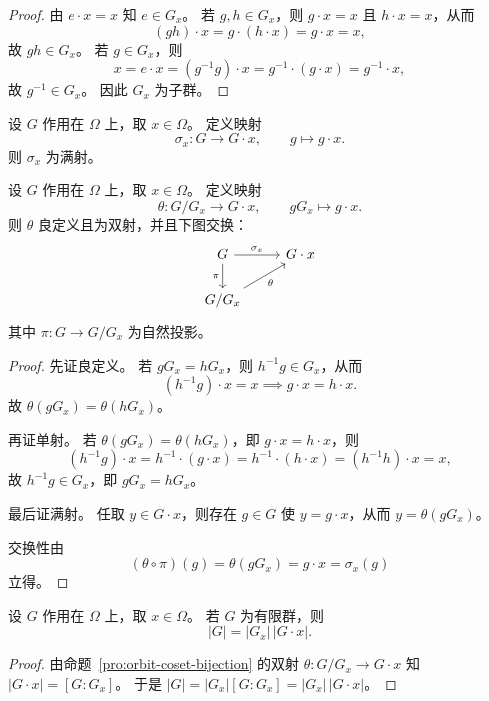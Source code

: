 \documentclass[lang=cn,a4paper,newtx]{elegantbook}
\begin{document}
\begin{proof}
  由 $e\cdot x=x$ 知 $e\in G_x$。
  若 $g,h\in G_x$，则 $g\cdot x=x$ 且 $h\cdot x=x$，从而
  \[
    (gh)\cdot x=g\cdot(h\cdot x)=g\cdot x=x,
  \]
  故 $gh\in G_x$。
  若 $g\in G_x$，则
  \[
    x=e\cdot x=(g^{-1}g)\cdot x=g^{-1}\cdot(g\cdot x)=g^{-1}\cdot x,
  \]
  故 $g^{-1}\in G_x$。
  因此 $G_x$ 为子群。
\end{proof}

\begin{definition}[轨道映射]
  设 $G$ 作用在 $\Omega$ 上，取 $x\in\Omega$。
  定义映射
  \[
    \sigma_x:G\to G\cdot x,\qquad g\mapsto g\cdot x.
  \]
  则 $\sigma_x$ 为满射。
\end{definition}

\begin{proposition}[轨道与陪集的对应]\label{orbit-coset-bijection}
  设 $G$ 作用在 $\Omega$ 上，取 $x\in\Omega$。
  定义映射
  \[
    \theta:G/G_x\to G\cdot x,\qquad gG_x\mapsto g\cdot x.
  \]
  则 $\theta$ 良定义且为双射，并且下图交换：
  \[
    \begin{tikzcd}
      G \arrow[r,"\sigma_x"] \arrow[d,"\pi"'] & G\cdot x \\
      G/G_x \arrow[ru,"\theta"'] &
    \end{tikzcd}
  \]
  其中 $\pi:G\to G/G_x$ 为自然投影。
\end{proposition}

\begin{proof}
  先证良定义。
  若 $gG_x=hG_x$，则 $h^{-1}g\in G_x$，从而
  \[
    (h^{-1}g)\cdot x=x\implies g\cdot x=h\cdot x.
  \]
  故 $\theta(gG_x)=\theta(hG_x)$。

  再证单射。
  若 $\theta(gG_x)=\theta(hG_x)$，即 $g\cdot x=h\cdot x$，则
  \[
    (h^{-1}g)\cdot x=h^{-1}\cdot(g\cdot x)=h^{-1}\cdot(h\cdot x)=(h^{-1}h)\cdot x=x,
  \]
  故 $h^{-1}g\in G_x$，即 $gG_x=hG_x$。

  最后证满射。
  任取 $y\in G\cdot x$，则存在 $g\in G$ 使 $y=g\cdot x$，从而 $y=\theta(gG_x)$。

  交换性由
  \[
    (\theta\circ\pi)(g)=\theta(gG_x)=g\cdot x=\sigma_x(g)
  \]
  立得。
\end{proof}

\begin{corollary}[轨道--稳定子公式]
  设 $G$ 作用在 $\Omega$ 上，取 $x\in\Omega$。
  若 $G$ 为有限群，则
  \[
    |G|=|G_x|\,|G\cdot x|.
  \]
\end{corollary}

\begin{proof}
  由命题~\ref{pro:orbit-coset-bijection} 的双射 $\theta:G/G_x\to G\cdot x$ 知 $|G\cdot x|=[G:G_x]$。
  于是 $|G|=|G_x|[G:G_x]=|G_x|\,|G\cdot x|$。
\end{proof}
\end{document}
